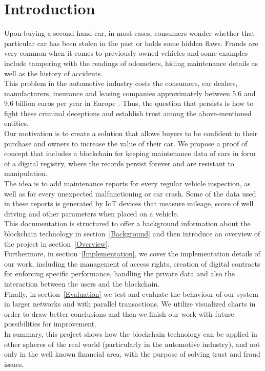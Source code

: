 \section{Introduction}


Upon buying a second-hand car, in most cases, consumers wonder whether that particular car has been stolen in the past or holds some hidden flaws. Frauds are very common when it comes to previously owned vehicles and some examples include tampering with the readings of odometers, hiding maintenance details as well as the history of accidents.\\
\newline
This problem in the automotive industry costs the consumers, car dealers, manufacturers, insurance and leasing companies approximately between 5.6 and 9.6 billion euros per year in Europe \cite{Costs}.
Thus, the question that persists is how to fight these criminal deceptions and establish trust among the above-mentioned entities.\\
\newline
Our motivation is to create a solution that allows buyers to be confident in their purchase and owners to increase the value of their car. We propose a proof of concept that includes a blockchain for keeping maintenance data of cars in form of a digital registry, where the records persist forever and are resistant to manipulation.\\
\newline
The idea is to add maintenance reports for every regular vehicle inspection, as well as for every unexpected malfunctioning or car crash. Some of the data used in these reports is generated by IoT devices that measure mileage, score of well driving and other parameters when placed on a vehicle.\\ 
\newline
This documentation is structured to offer a background information about the blockchain technology in section~\ref{Background} and then introduce an overview of the project in section~\ref{Overview}.\\
\newline
Furthermore, in section~\ref{Implementation}, we cover the implementation details of our work, including the management of access rights, creation of digital contracts for enforcing specific performance, handling the private data and also the interaction between the users and the blockchain.\\
\newline
Finally, in section~\ref{Evaluation} we test and evaluate the behaviour of our system in larger networks and with parallel transactions. We utilize visualized charts in order to draw better conclusions and then we finish our work with future possibilities for improvement.\\
\newline
In summary, this project shows how the blockchain technology can be applied in other spheres of the real world (particularly in the automotive industry), and not only in the well known financial area, with the purpose of solving trust and fraud issues.